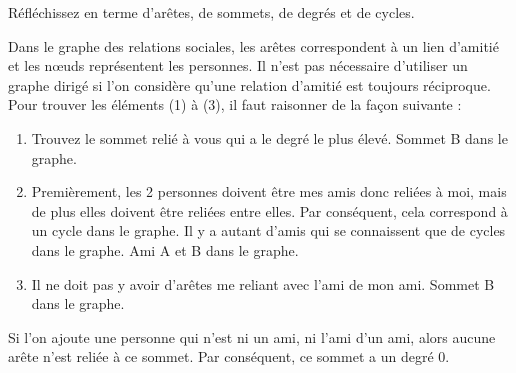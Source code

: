 \begin{Exercice}[10 minutes]
\begin{center}
\begin{tikzpicture}[scale=1.4]
    \end{tikzpicture}
    \end{center}
    \begin{conseil}
        Réfléchissez en terme d'arêtes, de sommets, de degrés et de cycles.
    \end{conseil}

    \begin{solution}
        Dans le graphe des relations sociales, les arêtes correspondent à un lien d'amitié et les nœuds représentent les personnes. Il n'est pas nécessaire d'utiliser un graphe dirigé si l'on considère qu'une relation d'amitié est toujours réciproque.\\
        
        Pour trouver les éléments (1) à (3), il faut raisonner de la façon suivante :
        \begin{enumerate}
            \item Trouvez le sommet relié à vous qui a le degré le plus élevé. Sommet B dans le graphe.
            \item Premièrement, les 2 personnes doivent être mes amis donc reliées à moi, mais de  plus elles doivent être reliées entre elles. Par conséquent, cela correspond à un cycle dans le graphe. Il y a autant d'amis qui se connaissent que de cycles dans le graphe. Ami A et B dans le graphe.
            \item Il ne doit pas y avoir d'arêtes me reliant avec l'ami de mon ami. Sommet B dans le graphe.
        \end{enumerate}
        
        Si l'on ajoute une personne qui n'est ni un ami, ni l'ami d'un ami, alors aucune arête n'est reliée à ce sommet. Par conséquent, ce sommet a un degré 0.
    \end{solution} 
\end{Exercice}


